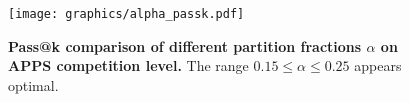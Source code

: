 \begin{figure}
    \centering
    \vspace{-0.35cm}\texttt{[image: graphics/alpha\_passk.pdf]}
    \vspace{-0.3cm}
    \caption{\textbf{Pass@k comparison of different \decomp partition fractions $\alpha$ on APPS competition level.} The range $0.15 \leq \alpha \leq 0.25$ appears optimal.}\vspace{-0.35cm}
    \label{fig:alpha_passk}
\end{figure}







